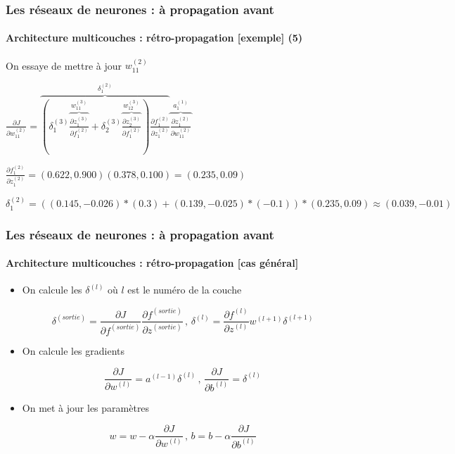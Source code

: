 \documentclass[xcolor=table]{beamer}
\begin{document}
\begin{frame}
\frametitle{Les réseaux de neurones : à propagation avant}
\framesubtitle{Architecture multicouches : rétro-propagation [exemple] (5)}

On essaye de mettre à jour $w_{11}^{(2)}$

$
\frac{\partial J}{\partial w_{11}^{(2)}} = 
\overbrace{ 
\left(
	\delta_{1}^{(3)} 
	\overbrace{
		\frac{\partial z_{1}^{(3)}}{\partial f_{1}^{(2)}}
	}^{w_{11}^{(3)}}
	+
	\delta_{2}^{(3)} 
	\overbrace{
		\frac{\partial z_{2}^{(3)}}{\partial f_{1}^{(2)}}
	}^{w_{12}^{(3)}}
\right)
\frac{\partial f_{1}^{(2)}}{\partial z_{1}^{(2)}}
}^{\delta_{1}^{(2)}} 
\overbrace{
	\frac{\partial z_{1}^{(2)}}{\partial w_{11}^{(2)}}
}^{a_{1}^{(1)}}
$

$
\frac{\partial f_{1}^{(2)}}{\partial z_{1}^{(2)}} = (0.622, 0.900) (0.378, 0.100) = (0.235, 0.09)
$

$
\delta_{1}^{(2)} = \left((0.145, -0.026) * (0.3) + (0.139, -0.025) * (-0.1)\right) * (0.235, 0.09) \approx (0.039, -0.01)
$


%

\end{frame}

\begin{frame}
\frametitle{Les réseaux de neurones : à propagation avant}
\framesubtitle{Architecture multicouches : rétro-propagation [cas général]}

\begin{itemize}
	\item On calcule les $\delta^{(l)}$ où $l$ est le numéro de la couche
\end{itemize}

\[ 
\delta^{(sortie)} = 
\frac{\partial J}{\partial f^{(sortie)}} \frac{\partial f^{(sortie)}}{\partial z^{(sortie)}}
\,,\,
\delta^{(l)} = \frac{\partial f^{(l)}}{\partial z^{(l)}} w^{(l+1)} \delta^{(l+1)}
\]

\begin{itemize}
	\item On calcule les gradients
\end{itemize}

\[ 
\frac{\partial J}{\partial w^{(l)}} = a^{(l-1)} \delta^{(l)}
\,,\,
\frac{\partial J}{\partial b^{(l)}} = \delta^{(l)}
\]

\begin{itemize}
	\item On met à jour les paramètres
\end{itemize}

\[ 
w = w - \alpha \frac{\partial J}{\partial w^{(l)}}
\,,\,
b = b - \alpha \frac{\partial J}{\partial b^{(l)}}
\]


\end{frame}
\end{document}
